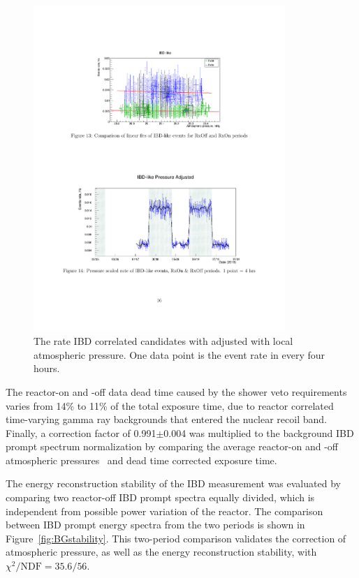 \begin{figure}[h!]
    \centering
    \includegraphics[width=0.85\textwidth]{Figures/IBDStability.pdf}
    \caption[IBD event rate stability]{
	The rate IBD correlated candidates with adjusted with local atmospheric pressure. 
	One data point is the event rate in every four hours.
    }
    \label{fig:IBDstability}
\end{figure}

The reactor-on and -off data dead time caused by the shower veto requirements varies from 14\% to 11\% of the total exposure time, due to reactor correlated time-varying gamma ray backgrounds that entered the nuclear recoil band.
Finally, a correction factor of 0.991$\pm$0.004 was multiplied to the background IBD prompt spectrum normalization by comparing the average reactor-on and -off atmospheric pressures~\cite{bib:ornl_weather} and dead time corrected exposure time.

The energy reconstruction stability of the IBD measurement was evaluated by comparing two reactor-off IBD prompt spectra equally divided, which is independent from possible power variation of the reactor.
The comparison between IBD prompt energy spectra from the two periods is shown in Figure~\ref{fig:BGstability}.
This two-period comparison validates the correction of atmospheric pressure, as well as the energy reconstruction stability, with $\chi^2/\mathrm{NDF} = 35.6/56$.

